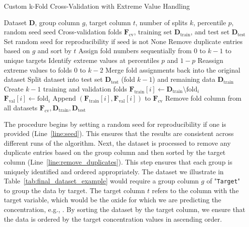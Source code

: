 \begin{algorithm}
\caption{Custom k-Fold Cross-Validation with Extreme Value Handling}
\begin{algorithmic}[1]
\Require Dataset \( \mathbf{D} \), group column \( g \), target column \( t \), number of splits \( k \), percentile \( p \), random seed \( \text{seed} \)
\Ensure Cross-validation folds \( \mathbf{F}_\text{cv} \), training set \( \mathbf{D}_\text{train} \), and test set \( \mathbf{D}_\text{test} \)
\State \label{line:seed} Set random seed for reproducibility if \(\text{seed} \) is not None
\State \label{line:remove_duplicates} Remove duplicate entries based on \( g \) and sort by \( t \)
\State \label{line:assign_folds} Assign fold numbers sequentially from 0 to \( k-1 \) to unique targets
    \State \label{line:identify_extremes} Identify extreme values at percentiles \( p \) and \( 1-p \)
    \State \label{line:reassign_extremes} Reassign extreme values to folds \( 0 \) to \( k-2 \)
\EndIf
\State \label{line:merge_folds} Merge fold assignments back into the original dataset
\State \label{line:split_dataset} Split dataset into test set \( \mathbf{D}_\text{test} \) (fold \( k-1 \)) and remaining data \( \mathbf{D}_\text{train} \)
\State \label{line:create_folds} Create \( k-1 \) training and validation folds
    \State \( \mathbf{F}_\text{train}[i] \gets \mathbf{D}_\text{train} \setminus \text{fold}_i \)
    \State \( \mathbf{F}_\text{val}[i] \gets \text{fold}_i \)
    \State Append \((\mathbf{F}_\text{train}[i], \mathbf{F}_\text{val}[i])\) to \(\mathbf{F}_\text{cv}\)
\EndFor
\State \label{line:remove_fold_column} Remove fold column from all datasets
\State \Return \( \mathbf{F}_\text{cv}, \mathbf{D}_\text{train}, \mathbf{D}_\text{test} \)
\end{algorithmic}
\end{algorithm}

The procedure begins by setting a random seed for reproducibility if one is provided (Line~\ref{line:seed}).
This ensures that the results are consistent across different runs of the algorithm.
Next, the dataset is processed to remove any duplicate entries based on the group column and then sorted by the target column (Line~\ref{line:remove_duplicates}).
This step ensures that each group is uniquely identified and ordered appropriately.
The dataset we illustrate in Table~\ref{tab:final_dataset_example} would require a group column $g$ of "\texttt{Target}" to group the data by target.
The target column $t$ refers to the column with the target variable, which would be the oxide for which we are predicting the concentration, e.g., .
By sorting the dataset by the target column, we ensure that the data is ordered by the target concentration values in ascending order.

